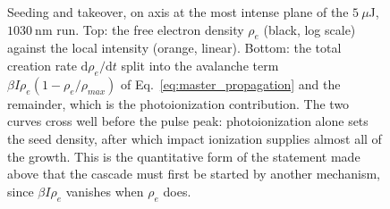 \begin{figure}[htbp]
    \centering
    \caption{Seeding and takeover, on axis at the most intense plane of the $5\ \mu$J, $1030\ \text{nm}$ run. Top: the free electron density $\rho_e$ (black, log scale) against the local intensity (orange, linear). Bottom: the total creation rate $\mathrm{d}\rho_e/\mathrm{d}t$ split into the avalanche term $\beta I \rho_e (1-\rho_e/\rho_{max})$ of Eq.~\eqref{eq:master_propagation} and the remainder, which is the photoionization contribution. The two curves cross well before the pulse peak: photoionization alone sets the seed density, after which impact ionization supplies almost all of the growth. This is the quantitative form of the statement made above that the cascade must first be started by another mechanism, since $\beta I \rho_e$ vanishes when $\rho_e$ does.}
    \label{fig:rep_avalanche_takeover}
\end{figure}

